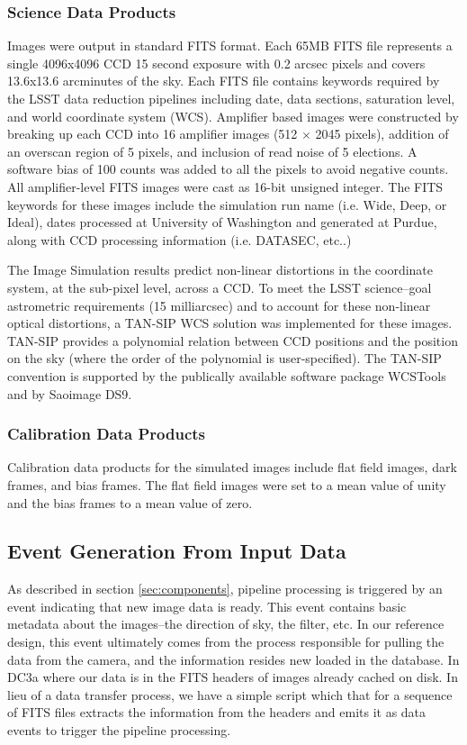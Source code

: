 \subsubsection{Science Data Products}

Images were output in standard FITS format. Each 65MB FITS file
represents a single 4096x4096 CCD 15 second exposure with 0.2 arcsec
pixels and covers 13.6x13.6 arcminutes of the sky. Each FITS file
contains keywords required by the LSST data reduction pipelines
including date, data sections, saturation level, and world coordinate
system (WCS).  Amplifier based images were constructed by breaking up
each CCD into 16 amplifier images (512 $\times$ 2045 pixels), addition
of an overscan region of 5 pixels, and inclusion of read noise of 5
elections.  A software bias of 100 counts was added to all the pixels
to avoid negative counts.  All amplifier-level FITS images were cast
as 16-bit unsigned integer. The FITS keywords for these images include
the simulation run name (i.e. Wide, Deep, or Ideal), dates processed
at University of Washington and generated at Purdue, along with CCD
processing information (i.e. DATASEC, etc..)

The Image Simulation results predict non-linear distortions in the
coordinate system, at the sub-pixel level, across a CCD. To meet the
LSST science--goal astrometric requirements (15 milliarcsec) and to
account for these non-linear optical distortions, a TAN-SIP WCS
solution was implemented for these images. TAN-SIP provides a
polynomial relation between CCD positions and the position on the sky
(where the order of the polynomial is user-specified). The TAN-SIP
convention is supported by the publically available software package
WCSTools and by Saoimage DS9. 

\subsubsection{Calibration Data Products}

Calibration data products for the simulated images include flat field
images, dark frames, and bias frames. The flat field images were set
to a mean value of unity and the bias frames to a mean value
of zero.

\subsection{Event Generation From Input Data}

As described in section \ref{sec:components}, pipeline processing is
triggered by an event indicating that new image data is
ready.  This event contains basic metadata about the images--the
direction of sky, the filter, etc.  In our reference design, this
event ultimately comes from the process responsible for pulling the
data from the camera, and the information resides new loaded in the
database.  In DC3a where our data is in the FITS headers of images
already cached on disk.  In lieu of a data transfer process, we have a
simple script which that for a sequence of FITS files extracts the
information from the headers and emits it as data events to trigger
the pipeline processing.


